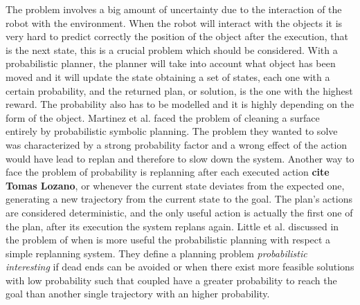 The problem involves a big amount of uncertainty due to the interaction of the robot with the environment. When the robot will interact with the objects it is very hard to predict correctly the position of the object after the execution, that is the next state, this is a crucial problem which should be considered. With a probabilistic planner, the planner will take into account what object has been moved and it will update the state obtaining a set of states, each one with a certain probability, and the returned plan, or solution, is the one with the highest reward. The probability also has to be modelled and it is highly depending on the form of the object.
Martinez et al. \citep{martinez2015planning} faced the problem of cleaning a surface entirely by probabilistic symbolic planning. The problem they wanted to solve was characterized by a strong probability factor and a wrong effect of the action would have lead to replan and therefore to slow down the system.
Another way to face the problem of probability is replanning after each executed action \textbf{cite Tomas Lozano}, or whenever the current state deviates from the expected one, generating a new trajectory from the current state to the goal. The plan's actions are considered deterministic, and the only useful action is actually the first one of the plan, after its execution the system replans again. Little et al. discussed in \cite{little2007probabilistic} the problem of when is more useful the probabilistic planning with respect a simple replanning system. 
They define a planning problem \textit{probabilistic interesting} if dead ends can be avoided or when there exist more feasible solutions with low probability such that coupled have a greater probability to reach the goal than another single trajectory with an higher probability.


